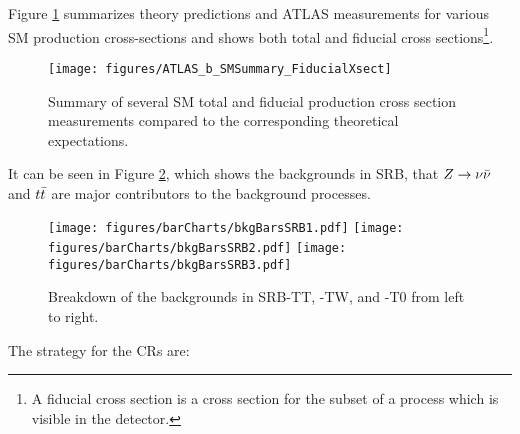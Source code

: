 Figure \ref{fig:atlasbsmsummaryfiducialxsect} summarizes theory predictions and ATLAS measurements for various SM production cross-sections and shows both total and fiducial cross sections\footnote{A fiducial cross section is a cross section for the subset of a process which is visible in the detector.}.  \\




\begin{figure}[tbh!]
	\centering
	\texttt{[image: figures/ATLAS\_b\_SMSummary\_FiducialXsect]}
	\caption[SM fiducial production cross sections.]{Summary of several SM total and fiducial production cross section measurements compared to the corresponding theoretical expectations\cite{atlassmsummaryplots}.}
	\label{fig:atlasbsmsummaryfiducialxsect}
\end{figure}

It can be seen in Figure \ref{fig:bkgSRB}, which shows the backgrounds in SRB, that $Z\rightarrow \nu \bar{\nu}$ and $t\bar{t}$ are major contributors to the background processes. \\


\begin{figure}[H] 
\begin{center}
 \texttt{[image: figures/barCharts/bkgBarsSRB1.pdf]} %
 \texttt{[image: figures/barCharts/bkgBarsSRB2.pdf]} %
 \texttt{[image: figures/barCharts/bkgBarsSRB3.pdf]} %
    \caption[Backgrounds in SRB.]{Breakdown of the backgrounds in SRB-TT, -TW, and -T0 from left to right.}
    \label{fig:bkgSRB}
\end{center}
\end{figure}


The strategy for the CRs are:

